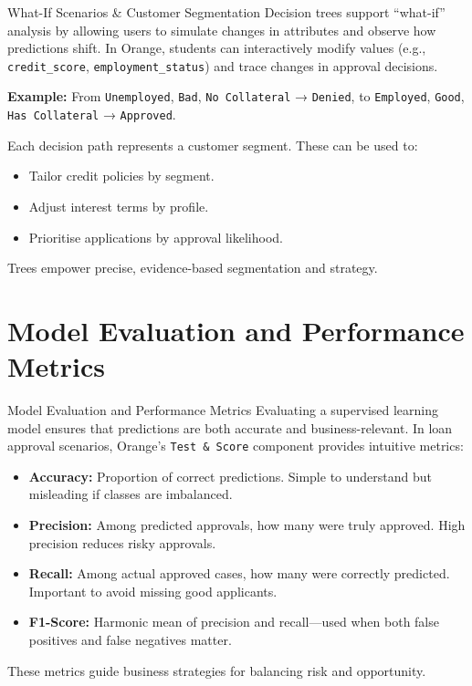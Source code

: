 \documentclass[aspectratio=169, table]{beamer}
\begin{document}
\begin{frame}{What-If Scenarios \& Customer Segmentation}
	\vspace{10pt}
	Decision trees support “what-if” analysis by allowing users to simulate changes in attributes and observe how predictions shift. In Orange, students can interactively modify values (e.g., \texttt{credit\_score}, \texttt{employment\_status}) and trace changes in approval decisions.
	
	\textbf{Example:}
	From \texttt{Unemployed}, \texttt{Bad}, \texttt{No Collateral} → \texttt{Denied},  
	to \texttt{Employed}, \texttt{Good}, \texttt{Has Collateral} → \texttt{Approved}.
	
	Each decision path represents a customer segment. These can be used to:
	\begin{itemize}
		\item Tailor credit policies by segment.
		\item Adjust interest terms by profile.
		\item Prioritise applications by approval likelihood.
	\end{itemize}
	
	Trees empower precise, evidence-based segmentation and strategy.
\end{frame}

\section{Model Evaluation and Performance Metrics}

\begin{frame}{Model Evaluation and Performance Metrics}
	\vspace{10pt}
	Evaluating a supervised learning model ensures that predictions are both accurate and business-relevant. In loan approval scenarios, Orange’s \texttt{Test \& Score} component provides intuitive metrics:
	
	\begin{itemize}
		\item \textbf{Accuracy:} Proportion of correct predictions. Simple to understand but misleading if classes are imbalanced.
		\item \textbf{Precision:} Among predicted approvals, how many were truly approved. High precision reduces risky approvals.
		\item \textbf{Recall:} Among actual approved cases, how many were correctly predicted. Important to avoid missing good applicants.
		\item \textbf{F1-Score:} Harmonic mean of precision and recall—used when both false positives and false negatives matter.
	\end{itemize}
	
	These metrics guide business strategies for balancing risk and opportunity.
\end{frame}
\end{document}
